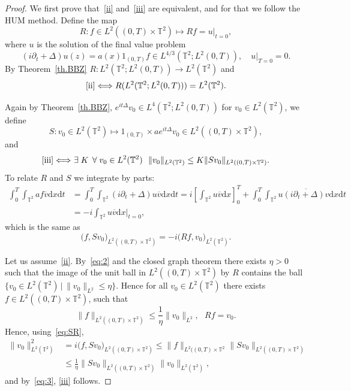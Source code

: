 \documentclass[11pt]{article}
\theoremstyle{definition}
\numberwithin{equation}{section}
\numberwithin{figure}{section}
\numberwithin{table}{section}
\newcommand{\TT}{{\mathbb T}}
\newcommand*{\dd}{\mathrm{d}}
\newcommand*{\dx}{\dd x}
\newcommand*{\dt}{\dd t}
\let\oldexists\exists
\renewcommand*{\exists}{\mathrel{\oldexists}}
\let\oldforall\forall
\renewcommand*{\forall}{\mathrel{\oldforall}}
\newcommand*{\tq}{\,|\,}
\begin{document}
\begin{proof}
We first prove that~\eqref{ii} and~\eqref{iii} are equivalent, and for that we follow the HUM method. Define the map
\[
R: f \in L^2((0,T) \times \TT^2) \mapsto R f = u |_{t=0},
\]
where $u$ is the solution of the final value problem
\[
(i \partial_t + \Delta) u (z) = a(x) 1_{(0,T)}f \in L^{4/3}(\TT^2; L^2(0,T)), \quad u |_{T=0} =0.
\]
By Theorem~\ref{th.BBZ} $ R : L^{2}(\TT^2; L^2(0,T)) \to L^2 (\TT^2) $ and
\begin{equation}\label{eq:2}
\eqref{ii}\Longleftrightarrow R (L^{2}(\TT^2; L^2(0,T))) = L^2 (\TT^2).
\end{equation}

Again by Theorem~\ref{th.BBZ}, $e^{it \Delta} v_0 \in L^4(\TT^2; L^2(0,T)) $ for $ v_0 \in L^2 (\TT^2) $, we define
\[
S: v_0 \in L^2(\TT^2) \mapsto 1_{(0,T)} \times a e^{it \Delta} v_0 \in L^2((0,T) \times \TT^2),
\]
and
\begin{equation}\label{eq:3}
\eqref{iii}\Longleftrightarrow \ \exists K \, \forall v_0 \in L^2 (\TT^2) \ \
\| v_0 \|_{L^2 (\TT^2) } \leq K\| S v_0 \|_{L^2 ((0, T) \times \TT^2)}.
\end{equation}
To relate $ R $ and $ S $ we integrate by parts:
\[
\begin{split}
\int_0^T \!\!\int_{\TT^2} af \overline {v} \dx \dt &= \int_0^T \!\!\int_{\TT^2} (i \partial_t + \Delta) u \overline {v} \dx \dt = i \left[\int_{\TT^2} u \overline{v} \dx \right] _0 ^T +\int_0^T \!\!\int_{\TT^2} u \overline {(i \partial_t + \Delta)v} \dx \dt
\\ & = -i \int_{\TT^2} u \overline{v} \dx|_{t=0},
\end{split}
\]
which is the same as
\begin{equation}\label{eq:SR}
\bigl(f, Sv_0\bigr)_{L^2((0,T)\times \TT^2)} = -i \bigl(Rf, v_0\bigr)_{L^2(\TT^2)}.
\end{equation}

Let us assume~\eqref{ii}. By~\eqref{eq:2} and the closed graph theorem there exists $\eta>0$ such that the image of the unit ball in $L^2((0,T) \times \TT^2)$ by $R$ contains the ball $ \{ v_0 \in L^2 (\TT^2) \tq \| v_0 \|_{L^2} \leq \eta \} $. Hence for all $ v_0 \in L^2 (\TT^2) $ there exists $ f \in L^2((0,T) \times \TT^2)$, such that
\[
\| f \|_{ L^2 ((0,T) \times \TT^2) } \leq \frac 1 \eta \| v_0\|_{ L^2}, \ \ \ R f = v_0.
\]
Hence, using~\eqref{eq:SR},
\begin{equation}
\begin{split}
\| v_0 \| _{L^2(\TT^2)}^2 & = i \bigl(f, Sv_0\bigr)_{L^2((0,T)\times \TT^2)} \leq \| f\|_{L^2((0,T)\times \TT^2} \| Sv_0 \|_{L^2((0,T)\times \TT^2)}
\\
& \leq \frac 1 \eta \| Sv_0 \|_{L^2((0,T)\times \TT^2)}
\| v_0 \| _{L^2(\TT^2)},
\end{split}
\end{equation}
and by~\eqref{eq:3}, {\eqref{iii}} follows.


\end{proof}
\end{document}
